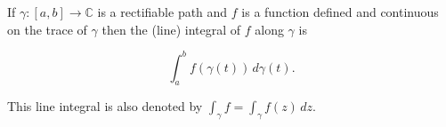 If $\gamma: [a, b] \to \mathbb{C}$ is a rectifiable path and $f$ is a function defined and continuous on the trace of $\gamma$ then the (line) integral of $f$ along $\gamma$ is

$$\int_{a}^{b} f(\gamma(t)) \, d\gamma(t).$$

This line integral is also denoted by $\int_{\gamma} f = \int_{\gamma} f(z) \, dz$.
